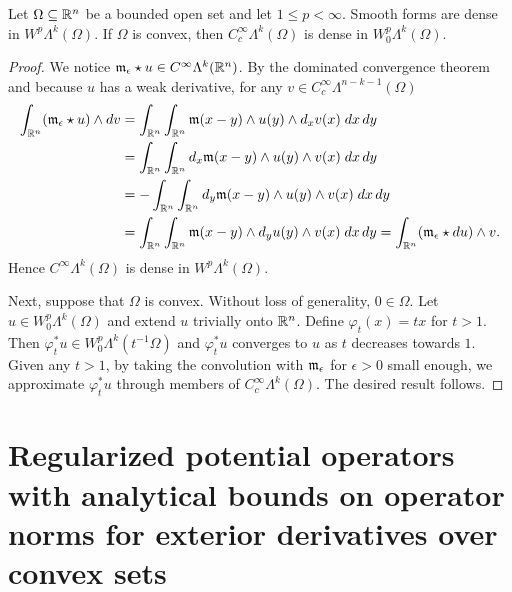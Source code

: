 \documentclass[10pt,letterpaper]{article}
\newcommand\cye[1]{%
  \protect\leavevmode
  \begingroup
    \color{red!35!yellow}%
    #1%
  \endgroup
}
\begin{document}
\begin{lemma}
    Let $\Omega \subseteq {\mathbb R}^{n}$ be a bounded open set and let $1 \leq p < \infty$. 
    Smooth forms are dense in $W^{p}\Lambda^{k}(\Omega)$.
    If $\Omega$ is convex, then $C^{\infty}_{c}\Lambda^{k}(\Omega)$ is dense in $W^{p}_{0}\Lambda^{k}(\Omega)$.
\end{lemma}
\begin{proof}
    We notice ${\mathfrak m}_{\epsilon} \star u \in C^{\infty}\Lambda^{k}({\mathbb R}^{n})$. 
    By the dominated convergence theorem and because $u$ has a weak derivative,
    for any $v \in C^{\infty}_{c}\Lambda^{n-k-1}(\Omega)$
    \begin{align*}
        \int_{{\mathbb R}^{n}} ( {\mathfrak m}_{\epsilon} \star u ) \wedge d v 
        &= 
        \int_{{\mathbb R}^{n}} \int_{{\mathbb R}^{n}} {\mathfrak m}(x-y) \wedge u(y) \wedge d_{x} v(x) \;dx\,dy
        \\&= 
        \int_{{\mathbb R}^{n}} \int_{{\mathbb R}^{n}} d_x{\mathfrak m}(x-y) \wedge u(y) \wedge v(x) \;dx\,dy
        \\&= 
        - \int_{{\mathbb R}^{n}} \int_{{\mathbb R}^{n}} d_y{\mathfrak m}(x-y) \wedge u(y) \wedge v(x) \;dx\,dy
        \\&= 
        \int_{{\mathbb R}^{n}} \int_{{\mathbb R}^{n}} {\mathfrak m}(x-y) \wedge d_y u(y) \wedge v(x) \;dx\,dy
        = 
        \int_{{\mathbb R}^{n}} ( {\mathfrak m}_{\epsilon} \star d u ) \wedge v 
        .
    \end{align*}
    Hence $C^{\infty}\Lambda^{k}(\Omega)$ is dense in $W^{p}\Lambda^{k}(\Omega)$.
    
    Next, suppose that $\Omega$ is convex. Without loss of generality, $0 \in \Omega$. 
    Let $u \in W^{p}_{0}\Lambda^{k}(\Omega)$ and extend $u$ trivially onto ${\mathbb R}^{n}$. 
    Define $\varphi_t(x) = tx$ for $t > 1$. 
    Then $\varphi_{t}^{\ast} u \in W^{p}_{0}\Lambda^{k}(t^{-1}\Omega)$ 
    and $\varphi_{t}^{\ast} u$ converges to $u$ as $t$ decreases towards $1$. 
    Given any $t > 1$, by taking the convolution with ${\mathfrak m}_{\epsilon}$ for $\epsilon > 0$ small enough,
    we approximate $\varphi_{t}^{\ast} u$ through members of $C^{\infty}_{c}\Lambda^{k}(\Omega)$.
    The desired result follows. 
\end{proof}


\section{Regularized potential operators \cye{with analytical bounds on operator norms for exterior derivatives} over convex sets}\label{section:potentialoperator}
\end{document}
